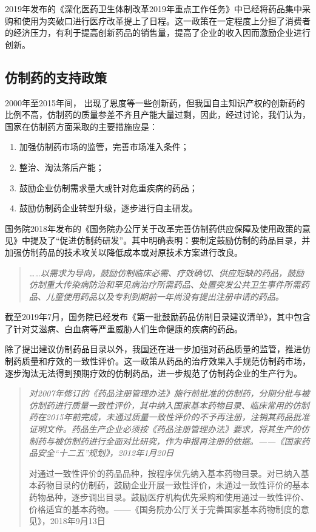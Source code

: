 \documentclass[twocolumn,openany]{ctexbook}
\begin{document}
			2019年发布的《深化医药卫生体制改革2019年重点工作任务》中已经将药品集中采购和使用为突破口进行医疗改革提上了日程。这一政策在一定程度上分担了消费者的经济压力，有利于提高创新药品的销售量，提高了企业的收入因而激励企业进行创新。
			
			\subsection{仿制药的支持政策}
			
			2000年至2015年间， 出现了恩度等一些创新药，但我国自主知识产权的创新药的比例不高，仿制药的质量参差不齐且产能大量过剩，因此，经过讨论，我们认为，国家在仿制药方面采取的主要措施应是：
			
			\begin{enumerate}
				\item 加强仿制药市场的监管，完善市场准入条件；
				\item 整治、淘汰落后产能；
				\item 鼓励企业仿制需求量大或针对危重疾病的药品；
				\item 鼓励仿制药企业转型升级，逐步进行自主研发。
			\end{enumerate}
			
			国务院2018年发布的《国务院办公厅关于改革完善仿制药供应保障及使用政策的意见》中提及了“促进仿制药研发”。其中明确表明：要制定鼓励仿制的药品目录，并加强仿制药品的技术攻关以降低成本或对原技术方案进行改良。
			
			\begin{quotation}
				\itshape
				……以需求为导向，鼓励仿制临床必需、疗效确切、供应短缺的药品，鼓励仿制重大传染病防治和罕见病治疗所需药品、处置突发公共卫生事件所需药品、儿童使用药品以及专利到期前一年尚没有提出注册申请的药品。
			\end{quotation}
			
			截至2019年7月，国务院已经发布《第一批鼓励药品仿制目录建议清单》，其中包含了针对艾滋病、白血病等严重威胁人们生命健康的疾病的药品。
			
			除了提出建议仿制药品目录以外，我国还在进一步加强对药品质量的监管，推进仿制药质量和疗效的一致性评价。这一政策从药品的治疗效果入手规范仿制药市场，逐步淘汰无法得到预期疗效的仿制药品，进一步规范了仿制药企业的生产行为。
			
			\begin{quotation}
				\itshape
				对2007年修订的《药品注册管理办法》施行前批准的仿制药，分期分批与被仿制药进行质量一致性评价，其中纳入国家基本药物目录、临床常用的仿制药在2015年前完成，未通过质量一致性评价的不予再注册，注销其药品批准证明文件。药品生产企业必须按《药品注册管理办法》要求，将其生产的仿制药与被仿制药进行全面对比研究，作为申报再注册的依据。——《国家药品安全“十二五”规划》，2012年1月20日
				
				对通过一致性评价的药品品种，按程序优先纳入基本药物目录。对已纳入基本药物目录的仿制药，鼓励企业开展一致性评价，未通过一致性评价的基本药物品种，逐步调出目录。鼓励医疗机构优先采购和使用通过一致性评价、价格适宜的基本药物。——《国务院办公厅关于完善国家基本药物制度的意见》，2018年9月13日
			\end{quotation}
\end{document}
